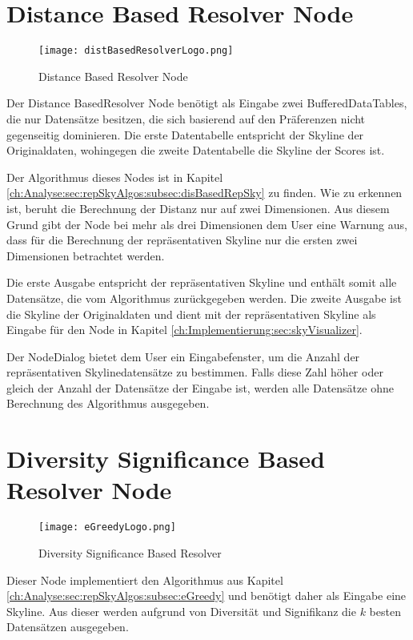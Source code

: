 \section{Distance Based Resolver Node}
\label{ch:Implementierung:sec:distBasedResolverNode}
\begin{figure}[H]
	\centering
	\texttt{[image: distBasedResolverLogo.png]}
	\caption{Distance Based Resolver Node}
	\label{img:distBasedResolverLogo}
\end{figure}

Der Distance BasedResolver Node benötigt als Eingabe zwei BufferedDataTables, die nur Datensätze besitzen, die sich basierend auf den Präferenzen nicht gegenseitig dominieren. Die erste Datentabelle entspricht der Skyline der Originaldaten, wohingegen die zweite Datentabelle die Skyline der Scores ist.

Der Algorithmus dieses Nodes ist in Kapitel \ref{ch:Analyse:sec:repSkyAlgos:subsec:disBasedRepSky} zu finden. Wie zu erkennen ist, beruht die Berechnung der Distanz nur auf zwei Dimensionen. Aus diesem Grund gibt der Node bei mehr als drei Dimensionen dem User eine Warnung aus, dass für die Berechnung der repräsentativen Skyline nur die ersten zwei Dimensionen betrachtet werden.

Die erste Ausgabe entspricht der repräsentativen Skyline und enthält somit alle Datensätze, die vom Algorithmus zurückgegeben werden. Die zweite Ausgabe ist die Skyline der Originaldaten und dient mit der repräsentativen Skyline als Eingabe für den Node in Kapitel \ref{ch:Implementierung:sec:skyVisualizer}.

Der NodeDialog bietet dem User ein Eingabefenster, um die Anzahl der repräsentativen Skylinedatensätze zu bestimmen. Falls diese Zahl höher oder gleich der Anzahl der Datensätze der Eingabe ist, werden alle Datensätze ohne Berechnung des Algorithmus ausgegeben.
\section{Diversity Significance Based Resolver Node}
\label{ch:Implementierung:sec:eGreedyNode}
\begin{figure}[H]
	\centering
	\texttt{[image: eGreedyLogo.png]}
	\caption{Diversity Significance Based Resolver}
	\label{img:eGreedyLogo}
\end{figure}

Dieser Node implementiert den Algorithmus aus Kapitel \ref{ch:Analyse:sec:repSkyAlgos:subsec:eGreedy} und benötigt daher als Eingabe eine Skyline. Aus dieser werden aufgrund von Diversität und Signifikanz die $k$ besten Datensätzen ausgegeben.

